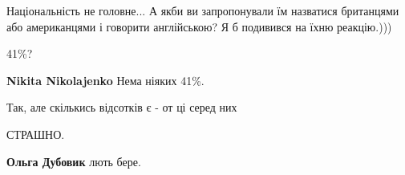 \begin{itemize}
 

Національність не головне... А якби ви запропонували їм назватися британцями
або американцями і говорити англійською? Я б подивився на їхню реакцію.)))


 
41\%?

\begin{itemize}
 
\textbf{Nikita Nikolajenko} Нема ніяких 41\%.

 
Так, але скількись відсотків є - от ці серед них
\end{itemize}

 
СТРАШНО.

\begin{itemize}
 
\textbf{Ольга Дубовик} лють бере.

 

\end{itemize}
\end{itemize}
